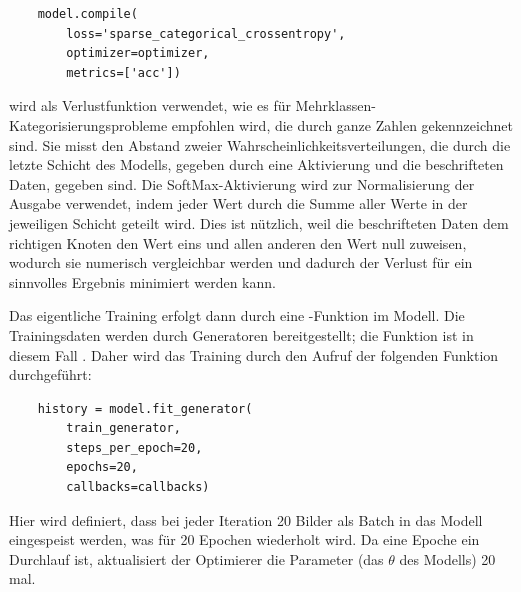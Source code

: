 \begin{lstlisting}
    model.compile(
        loss='sparse_categorical_crossentropy', 
        optimizer=optimizer,
        metrics=['acc'])
\end{lstlisting}

 wird als Verlustfunktion verwendet, wie es für Mehrklassen-Kategorisierungsprobleme empfohlen wird, die durch ganze Zahlen \cite[S.84]{Chollet2017} gekennzeichnet sind.
Sie misst den Abstand zweier Wahrscheinlichkeitsverteilungen, die durch die letzte Schicht des Modells, gegeben durch eine  Aktivierung und die beschrifteten Daten, gegeben sind.
Die SoftMax-Aktivierung wird zur Normalisierung der Ausgabe verwendet, indem jeder Wert durch die Summe aller Werte in der jeweiligen Schicht geteilt wird.
Dies ist nützlich, weil die beschrifteten Daten dem richtigen Knoten den Wert eins und allen anderen den Wert null zuweisen, wodurch sie numerisch vergleichbar werden und dadurch der Verlust für ein sinnvolles Ergebnis minimiert werden kann.

Das eigentliche Training erfolgt dann durch eine -Funktion im Modell.
Die Trainingsdaten werden durch Generatoren bereitgestellt; die Funktion ist in diesem Fall .
Daher wird das Training durch den Aufruf der folgenden Funktion durchgeführt:

\begin{lstlisting}
    history = model.fit_generator(
        train_generator,
        steps_per_epoch=20,
        epochs=20,
        callbacks=callbacks)
\end{lstlisting}

Hier wird definiert, dass bei jeder Iteration 20 Bilder als Batch in das Modell eingespeist werden, was für 20 Epochen wiederholt wird.
Da eine Epoche ein Durchlauf ist, aktualisiert der Optimierer die Parameter (das  $\theta$ des Modells) 20 mal.

